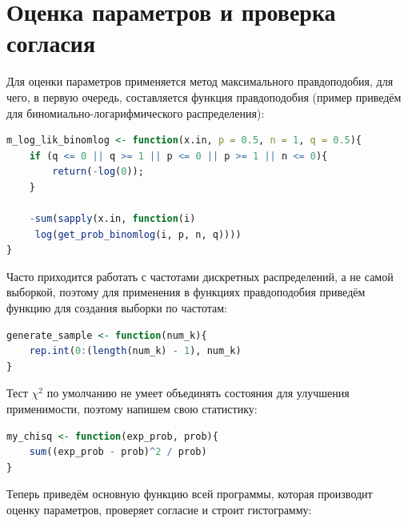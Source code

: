 \documentclass[12pt, specialist, subf, substylefile = spbu.rtx]{disser}
\begin{document}
	\section{Оценка параметров и проверка согласия}
	
	Для оценки параметров применяется метод максимального правдоподобия, для чего, в первую очередь, составляется функция правдоподобия (пример приведём для биномиально-логарифмического распределения):
	
	\begin{lstlisting}[language=R]
m_log_lik_binomlog <- function(x.in, p = 0.5, n = 1, q = 0.5){
	if (q <= 0 || q >= 1 || p <= 0 || p >= 1 || n <= 0){
		return(-log(0));
	}
	
	-sum(sapply(x.in, function(i)
	 log(get_prob_binomlog(i, p, n, q))))
}
	\end{lstlisting}

	Часто приходится работать с частотами дискретных распределений, а не самой выборкой, поэтому для применения в функциях правдоподобия приведём функцию для создания выборки по частотам:
	
\begin{lstlisting}[language=R]
generate_sample <- function(num_k){
	rep.int(0:(length(num_k) - 1), num_k)
}
\end{lstlisting}	

	Тест $\chi ^2$ по умолчанию не умеет объединять состояния для улучшения применимости, поэтому напишем свою статистику:
	
\begin{lstlisting}[language=R]
my_chisq <- function(exp_prob, prob){
	sum((exp_prob - prob)^2 / prob)
}
\end{lstlisting}

	Теперь приведём основную функцию всей программы, которая производит оценку параметров, проверяет согласие и строит гистограмму:
\end{document}
